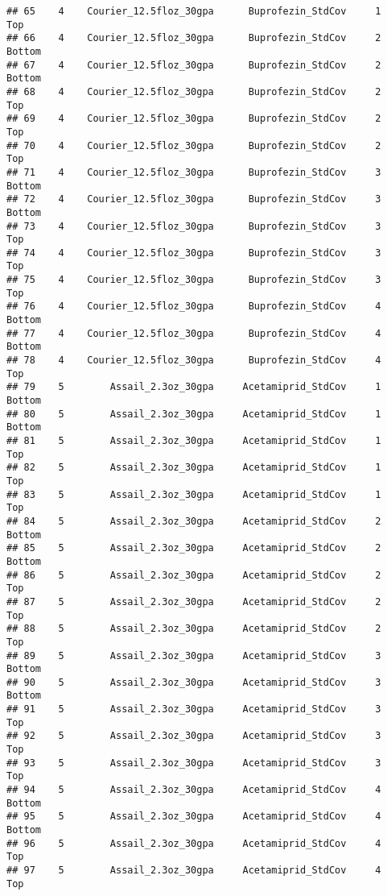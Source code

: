 \documentclass[
]{article}
\begin{document}
\begin{verbatim}
## 65    4    Courier_12.5floz_30gpa      Buprofezin_StdCov     1           Top
## 66    4    Courier_12.5floz_30gpa      Buprofezin_StdCov     2        Bottom
## 67    4    Courier_12.5floz_30gpa      Buprofezin_StdCov     2        Bottom
## 68    4    Courier_12.5floz_30gpa      Buprofezin_StdCov     2           Top
## 69    4    Courier_12.5floz_30gpa      Buprofezin_StdCov     2           Top
## 70    4    Courier_12.5floz_30gpa      Buprofezin_StdCov     2           Top
## 71    4    Courier_12.5floz_30gpa      Buprofezin_StdCov     3        Bottom
## 72    4    Courier_12.5floz_30gpa      Buprofezin_StdCov     3        Bottom
## 73    4    Courier_12.5floz_30gpa      Buprofezin_StdCov     3           Top
## 74    4    Courier_12.5floz_30gpa      Buprofezin_StdCov     3           Top
## 75    4    Courier_12.5floz_30gpa      Buprofezin_StdCov     3           Top
## 76    4    Courier_12.5floz_30gpa      Buprofezin_StdCov     4        Bottom
## 77    4    Courier_12.5floz_30gpa      Buprofezin_StdCov     4        Bottom
## 78    4    Courier_12.5floz_30gpa      Buprofezin_StdCov     4           Top
## 79    5        Assail_2.3oz_30gpa     Acetamiprid_StdCov     1        Bottom
## 80    5        Assail_2.3oz_30gpa     Acetamiprid_StdCov     1        Bottom
## 81    5        Assail_2.3oz_30gpa     Acetamiprid_StdCov     1           Top
## 82    5        Assail_2.3oz_30gpa     Acetamiprid_StdCov     1           Top
## 83    5        Assail_2.3oz_30gpa     Acetamiprid_StdCov     1           Top
## 84    5        Assail_2.3oz_30gpa     Acetamiprid_StdCov     2        Bottom
## 85    5        Assail_2.3oz_30gpa     Acetamiprid_StdCov     2        Bottom
## 86    5        Assail_2.3oz_30gpa     Acetamiprid_StdCov     2           Top
## 87    5        Assail_2.3oz_30gpa     Acetamiprid_StdCov     2           Top
## 88    5        Assail_2.3oz_30gpa     Acetamiprid_StdCov     2           Top
## 89    5        Assail_2.3oz_30gpa     Acetamiprid_StdCov     3        Bottom
## 90    5        Assail_2.3oz_30gpa     Acetamiprid_StdCov     3        Bottom
## 91    5        Assail_2.3oz_30gpa     Acetamiprid_StdCov     3           Top
## 92    5        Assail_2.3oz_30gpa     Acetamiprid_StdCov     3           Top
## 93    5        Assail_2.3oz_30gpa     Acetamiprid_StdCov     3           Top
## 94    5        Assail_2.3oz_30gpa     Acetamiprid_StdCov     4        Bottom
## 95    5        Assail_2.3oz_30gpa     Acetamiprid_StdCov     4        Bottom
## 96    5        Assail_2.3oz_30gpa     Acetamiprid_StdCov     4           Top
## 97    5        Assail_2.3oz_30gpa     Acetamiprid_StdCov     4           Top

\end{verbatim}
\end{document}
